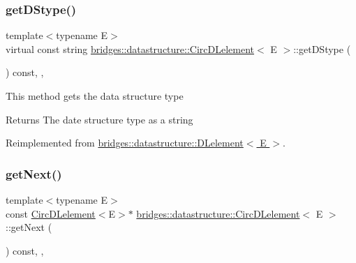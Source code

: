 \subsubsection{\texorpdfstring{get\+D\+Stype()}{getDStype()}}
{\footnotesize\ttfamily template$<$typename E$>$ \\
virtual const string \hyperlink{classbridges_1_1datastructure_1_1_circ_d_lelement}{bridges\+::datastructure\+::\+Circ\+D\+Lelement}$<$ E $>$\+::get\+D\+Stype (\begin{DoxyParamCaption}{ }\end{DoxyParamCaption}) const\hspace{0.3cm}{\ttfamily [inline]}, {\ttfamily [override]}, {\ttfamily [virtual]}}

This method gets the data structure type

\begin{DoxyReturn}{Returns}
The date structure type as a string 
\end{DoxyReturn}


Reimplemented from \hyperlink{classbridges_1_1datastructure_1_1_d_lelement_a736ba8e6901608fb0ab04d781d2cceee}{bridges\+::datastructure\+::\+D\+Lelement$<$ E $>$}.

\mbox{\label{classbridges_1_1datastructure_1_1_circ_d_lelement_a3b54f07ffa49151ed13d8b8df964a4ee}} 
\subsubsection{\texorpdfstring{get\+Next()}{getNext()}\hspace{0.1cm}{\footnotesize\ttfamily [1/2]}}
{\footnotesize\ttfamily template$<$typename E$>$ \\
const \hyperlink{classbridges_1_1datastructure_1_1_circ_d_lelement}{Circ\+D\+Lelement}$<$E$>$$\ast$ \hyperlink{classbridges_1_1datastructure_1_1_circ_d_lelement}{bridges\+::datastructure\+::\+Circ\+D\+Lelement}$<$ E $>$\+::get\+Next (\begin{DoxyParamCaption}{ }\end{DoxyParamCaption}) const\hspace{0.3cm}{\ttfamily [inline]}, {\ttfamily [override]}, {\ttfamily [virtual]}}

